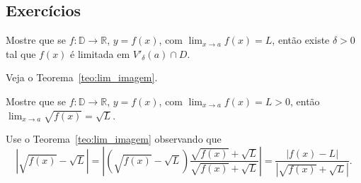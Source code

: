 \subsection*{Exercícios}

\begin{exer}
  Mostre que se $f:\mathbb{D}\to\mathbb{R}$, $y=f(x)$, com $\lim_{x\to a}f(x)=L$, então existe $\delta>0$ tal que $f(x)$ é limitada em $V'_\delta(a)\cap D$.
\end{exer}
\begin{resp}
  Veja o Teorema~\ref{teo:lim_imagem}.
\end{resp}

\begin{exer}
  Mostre que se $f:\mathbb{D}\to\mathbb{R}$, $y=f(x)$, com $\lim_{x\to a}f(x)=L>0$, então $\lim_{x\to a}\sqrt{f(x)}=\sqrt{L}$.
\end{exer}
\begin{resp}
  Use o Teorema~\ref{teo:lim_imagem} observando que
  \begin{equation}
    |\sqrt{f(x)}-\sqrt{L}| = |(\sqrt{f(x)}-\sqrt{L})\frac{\sqrt{f(x)}+\sqrt{L}}{\sqrt{f(x)}+\sqrt{L}}| = \frac{|f(x) - L|}{|\sqrt{f(x)}+\sqrt{L}|}.
  \end{equation}
\end{resp}